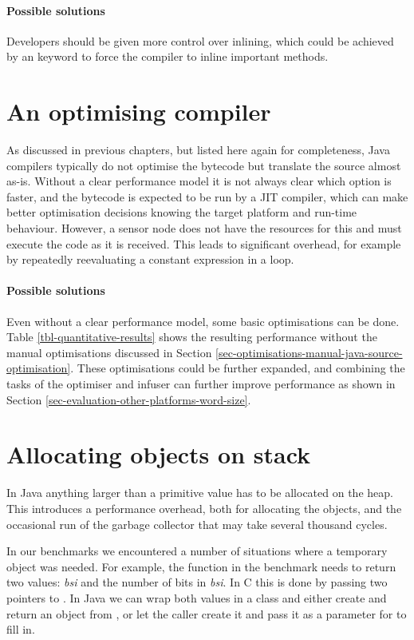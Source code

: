 \paragraph{Possible solutions}
Developers should be given more control over inlining, which could be achieved by an  keyword to force the compiler to inline important methods.



\section{An optimising compiler}
\label{sec-optimising-javac}
As discussed in previous chapters, but listed here again for completeness, Java compilers typically do not optimise the bytecode but translate the source almost as-is. Without a clear performance model it is not always clear which option is faster, and the bytecode is expected to be run by a JIT compiler, which can make better optimisation decisions knowing the target platform and run-time behaviour. However, a sensor node does not have the resources for this and must execute the code as it is received. This leads to significant overhead, for example by repeatedly reevaluating a constant expression in a loop.

\paragraph{Possible solutions}
Even without a clear performance model, some basic optimisations can be done. Table \ref{tbl-quantitative-results} shows the resulting performance without the manual optimisations discussed in Section \ref{sec-optimisations-manual-java-source-optimisation}. These optimisations could be further expanded, and combining the tasks of the optimiser and infuser can further improve performance as shown in Section \ref{sec-evaluation-other-platforms-word-size}.




\section{Allocating objects on stack}
\label{sec-no-gc}
In Java anything larger than a primitive value has to be allocated on the heap. This introduces a performance overhead, both for allocating the objects, and the occasional run of the garbage collector that may take several thousand cycles.

In our benchmarks we encountered a number of situations where a temporary object was needed. For example, the  function in the  benchmark needs to return two values: \emph{bsi} and the number of bits in \emph{bsi}. In C this is done by passing two pointers to . In Java we can wrap both values in a class and either create and return an object from , or let the caller create it and pass it as a parameter for  to fill in.

